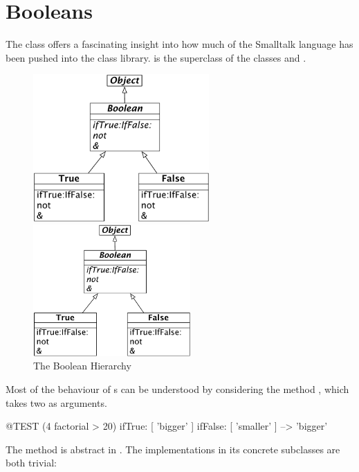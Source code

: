 \documentclass[a4paper,10pt,twoside]{book}
\begin{document}
\section{Booleans}

The class  offers a fascinating insight into how much of the Smalltalk language has been pushed into the class library.  is the  superclass of the  classes  and .

\begin{figure}[ht]
\ifluluelse
	{\centerline {\includegraphics[width=0.6\textwidth]{BooleanHierarchy}}}
	{\centerline {\includegraphics[width=6cm]{BooleanHierarchy}}}
\caption{The Boolean Hierarchy \label{fig:booleans}}
\end{figure}

Most of the behaviour of s can be understood by considering the method , which takes two  as arguments.

\begin{code}{@TEST}
(4 factorial > 20) ifTrue: [ 'bigger' ] ifFalse: [ 'smaller' ] --> 'bigger'
\end{code}

The method is abstract in .
The implementations in its concrete subclasses are both trivial:
\end{document}
